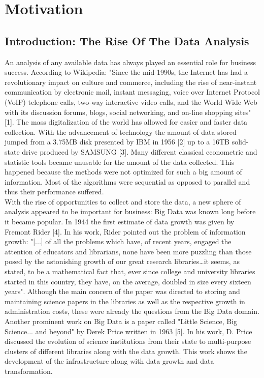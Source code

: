 \documentclass[
  twoside,
  11pt, a4paper,
  footinclude=true,
  headinclude=true,
  cleardoublepage=empty
]{scrreprt}
\begin{document}
    \chapter{Motivation}
        \section{Introduction: The Rise Of The Data Analysis}
        An analysis of any available data has always played an essential role for business success. According to Wikipedia: "Since the mid-1990s, the Internet has had a revolutionary impact on culture and commerce, including the rise of near-instant communication by electronic mail, instant messaging, voice over Internet Protocol (VoIP) telephone calls, two-way interactive video calls, and the World Wide Web with its discussion forums, blogs, social networking, and on-line shopping sites" [1]. The mass digitalization of the world has allowed for easier and faster data collection. With the advancement of technology the amount of data stored jumped from a 3.75MB disk presented by IBM in 1956 [2] up to a 16TB solid-state drive produced by SAMSUNG [3]. Many different classical econometric and statistic tools became unusable for the amount of the data collected. This happened because the methods were not optimized for such a big amount of information. Most of the algorithms were sequential as opposed to parallel and thus their performance suffered.\\
        With the rise of opportunities to collect and store the data, a new sphere of analysis appeared to be important for business: Big Data was known long before it became popular. In 1944 the first estimate of data growth was given by Fremont Rider [4]. In his work, Rider pointed out the problem of information growth: "[...] of all the problems which have, of recent years, engaged the attention of educators and librarians, none have been more puzzling than those posed by the astonishing growth of our great research libraries…it seems, as stated, to be a mathematical fact that, ever since college and university libraries started in this country, they have, on the average, doubled in size every sixteen years". Although the main concern of the paper was directed to storing and maintaining science papers in the libraries as well as the respective growth in administration costs, these were already the questions from the Big Data domain. Another prominent work on Big Data is a paper called "Little Science, Big Science... and beyond" by Derek Price written in 1963 [5]. In his work, D. Price discussed the evolution of science institutions from their state to multi-purpose clusters of different libraries along with the data growth. This work shows the development of the infrastructure along with data growth and data transformation.\\
\end{document}
